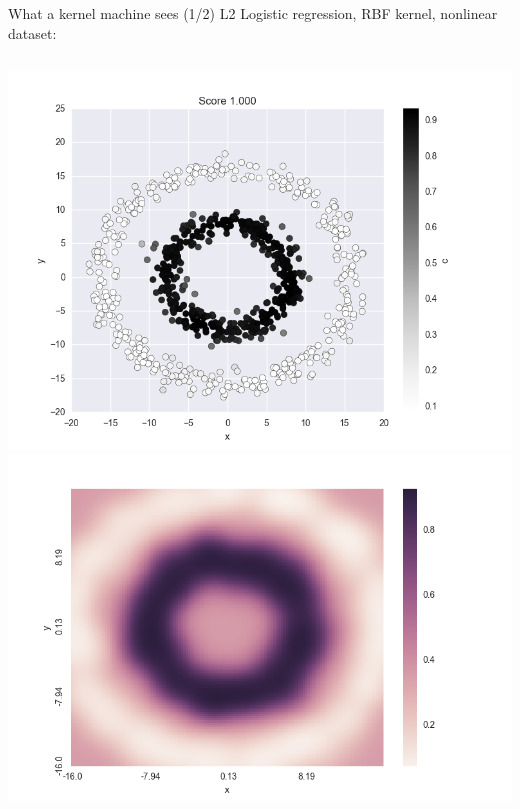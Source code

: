 \documentclass[11pt]{beamer}
\begin{document}
\begin{frame}{What a kernel machine sees (1/2) }
L2 Logistic regression, RBF kernel, nonlinear dataset:
\begin{columns}
\includegraphics[scale=0.25]{circles_labels.png} 
\includegraphics[scale=0.3]{circles_lenses.png} 
\end{columns}

\end{frame}
\end{document}
